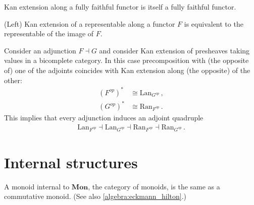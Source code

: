     \begin{property}[Faithfulness]
        Kan extension along a fully faithful functor is itself a fully faithful functor.
    \end{property}
    \begin{property}[Representability]
        (Left) Kan extension of a representable along a functor $F$ is equivalent to the representable of the image of $F$.
    \end{property}

    \begin{property}\label{cat:kan_quadruple}
        Consider an adjunction $F\dashv G$ and consider Kan extension of presheaves taking values in a bicomplete category. In this case precomposition with (the opposite of) one of the adjoints coincides with Kan extension along (the opposite) of the other:
        \begin{align}
            (F^{op})^* &\cong \mathrm{Lan}_{G^{op}}\,,\\
            (G^{op})^* &\cong \mathrm{Ran}_{F^{op}}\,.
        \end{align}
        This implies that every adjunction induces an adjoint quadruple
        \begin{gather}
            \mathrm{Lan}_{F^{op}}\dashv\mathrm{Lan}_{G^{op}}\dashv\mathrm{Ran}_{F^{op}}\dashv\mathrm{Ran}_{G^{op}}\,.
        \end{gather}
    \end{property}

\section{Internal structures}

    \begin{property}\label{cat:eckmann_hilton}
        A monoid internal to $\mathbf{Mon}$, the category of monoids, is the same as a commutative monoid. (See also \cref{algebra:eckmann_hilton}.)
    \end{property}

